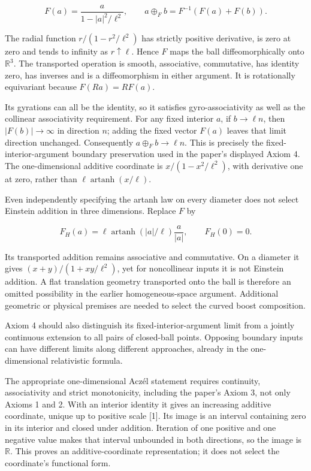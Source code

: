 \documentclass[
  11pt,
  a4paper,
]{article}
\begin{document}
\[
F(a)=\frac{a}{1-|a|^2/\ell^2},\qquad
a\oplus_F b=F^{-1}(F(a)+F(b)).
\]

The radial function \(r/(1-r^2/\ell^2)\) has strictly positive derivative, is zero at zero and tends to infinity as \(r\uparrow\ell\). Hence \(F\) maps the ball diffeomorphically onto \(\mathbb R^3\). The transported operation is smooth, associative, commutative, has identity zero, has inverses and is a diffeomorphism in either argument. It is rotationally equivariant because \(F(Ra)=RF(a)\).

Its gyrations can all be the identity, so it satisfies gyro-associativity as well as the collinear associativity requirement. For any fixed interior \(a\), if \(b\to\ell n\), then \(|F(b)|\to\infty\) in direction \(n\); adding the fixed vector \(F(a)\) leaves that limit direction unchanged. Consequently \(a\oplus_F b\to\ell n\). This is precisely the fixed-interior-argument boundary preservation used in the paper's displayed Axiom 4. The one-dimensional additive coordinate is \(x/(1-x^2/\ell^2)\), with derivative one at zero, rather than \(\ell\operatorname{artanh}(x/\ell)\).

Even independently specifying the artanh law on every diameter does not select Einstein addition in three dimensions. Replace \(F\) by

\[
F_H(a)=\ell\operatorname{artanh}(|a|/\ell)\frac{a}{|a|},
\qquad F_H(0)=0.
\]

Its transported addition remains associative and commutative. On a diameter it gives \((x+y)/(1+xy/\ell^2)\), yet for noncollinear inputs it is not Einstein addition. A flat translation geometry transported onto the ball is therefore an omitted possibility in the earlier homogeneous-space argument. Additional geometric or physical premises are needed to select the curved boost composition.

Axiom 4 should also distinguish its fixed-interior-argument limit from a jointly continuous extension to all pairs of closed-ball points. Opposing boundary inputs can have different limits along different approaches, already in the one-dimensional relativistic formula.

The appropriate one-dimensional Aczél statement requires continuity, associativity and strict monotonicity, including the paper's Axiom 3, not only Axioms 1 and 2. With an interior identity it gives an increasing additive coordinate, unique up to positive scale {[}1{]}. Its image is an interval containing zero in its interior and closed under addition. Iteration of one positive and one negative value makes that interval unbounded in both directions, so the image is \(\mathbb R\). This proves an additive-coordinate representation; it does not select the coordinate's functional form.
\end{document}

